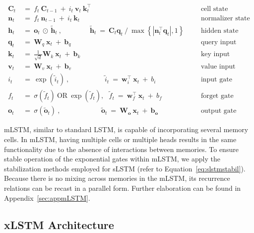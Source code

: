 \begin{align}
\label{eq:mlstm_recurrent_begin}
\mathbf{C}_t \ &= \  f_t \ \mathbf{C}_{t-1} \ + \ 
  i_t \ \mathbf{v}_t \ \mathbf{k}_t^\top & &  &\text{cell state} \\
\mathbf{n}_t \ &= \  f_t \ \mathbf{n}_{t-1} \ + \ 
  i_t \ \mathbf{k}_t & &  &\text{normalizer state} \\
\mathbf{h}_t  \ &= \ \mathbf{o}_t \ \odot \ \tilde{\mathbf{h}}_t
\ , \qquad \qquad 
\tilde{\mathbf{h}}_t \ = \   \mathbf{C}_t \mathbf{q}_t \ / \ 
  \max \left\{ |\mathbf{n}_t^\top \mathbf{q}_t|, 1 \right\} 
   &&&\text{hidden state} \\
\mathbf{q}_t \ &= \ \mathbf{W}_q \ \mathbf{x}_t \ + \ \mathbf{b}_q  & &  &\text{query input} \\
\mathbf{k}_t \ &= \ \frac{1}{\sqrt{d}} \mathbf{W}_k \ \mathbf{x}_t \ + \ \mathbf{b}_k  & &  &\text{key input} \\
\mathbf{v}_t \ &= \ \mathbf{W}_v \ \mathbf{x}_t \ + \ \mathbf{b}_v  & &  &\text{value input} \\
i_t \ &= \ \!\exp \!  \! \left( \tilde{i}_t  \right) \ , 
 \qquad \qquad \ \ \ \ \,
  \tilde{i}_t \ = \ \mathbf{w}^\top_{i} \ \mathbf{x}_t \ + \  b_{i} \ \ \ 
  &&&\text{input gate} \\
f_t \ &= \ \sigma \!  \left(  \tilde{f}_t \right) \ \text{OR} \ \!\exp \!  \! \left(  \tilde{f}_t \right) , \ \ \: \!
\tilde{f}_t \ = \ \mathbf{w}^\top_{f} \ \mathbf{x}_t  \ + \
  b_{f}
  &&& \text{forget gate} \\
\label{eq:mlstm_recurrent_end}
\mathbf{o}_t \ &= \ \sigma \left( \tilde{\mathbf{o}}_t \right) \ , \qquad \qquad \quad \ \ \ \,
  \tilde{\mathbf{o}}_t  \ = \ \mathbf{W}_{\mathbf{o}} \ \mathbf{x}_t \ + \
  \mathbf{b}_{\mathbf{o}}
  &&&\text{output gate} 
\end{align}

mLSTM, similar to standard LSTM, is capable of incorporating several memory cells. In mLSTM, having multiple cells or multiple heads results in the same functionality due to the absence of interactions between memories. To ensure stable operation of the exponential gates within mLSTM, we apply the stabilization methods employed for sLSTM (refer to Equation~\ref{eq:slstmstabil}). Because there is no mixing across memories in the mLSTM, its recurrence relations can be recast in a parallel form. Further elaboration can be found in Appendix~\ref{sec:appmLSTM}.

\subsection{xLSTM Architecture}
\label{sec:xLSTMarch}

